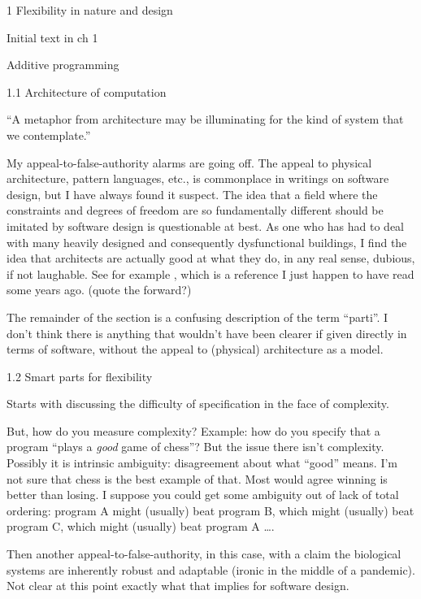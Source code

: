 \documentclass[11pt]{PalisadesLakesBook}
\begin{document}
\begin{plSection}{}
\begin{plSection}{1 Flexibility in nature and design}
\begin{plSection}{Initial text in ch 1}
\begin{plSection}{Additive programming}
\end{plSection}%
\end{plSection}%
\begin{plSection}{1.1 Architecture of computation}

``A metaphor from architecture may be illuminating for the kind
of system that we contemplate.''

My appeal-to-false-authority alarms are going off.
The appeal to physical architecture, pattern languages, etc.,
is commonplace in writings on software design,
but I have always found it suspect.
The idea that a field 
where the constraints and degrees of freedom
are so fundamentally different should be imitated 
by software design is questionable at best.
As one who has had to deal with many heavily designed
and consequently dysfunctional buildings,
I find the idea that architects are actually good at what they do,
in any real sense, dubious, if not laughable.
See for example ,
which is a reference I just happen to have read some years ago.
(\TODO quote the forward?)

The remainder of the section is a confusing description 
of the term ``parti''.
I don't think there is anything that wouldn't have been 
clearer if given directly in terms of software,
without the appeal to (physical) architecture as a model. 

\end{plSection}%
\begin{plSection}{1.2 Smart parts for flexibility}

Starts with discussing the difficulty of specification
in the face of complexity. 

But, how do you measure complexity?
Example: how do you specify that a program
``plays a \emph{good} game of chess''?
But the issue there isn't complexity.
Possibly it is intrinsic ambiguity: disagreement about what
``good'' means.
I'm not sure that chess is the best example of that.
Most would agree winning is better than losing.
I suppose you could get some ambiguity out of lack of
total ordering: 
program A might (usually) beat program B,
which might (usually) beat program C, 
which might (usually) beat program A {\ldots}.

Then another appeal-to-false-authority,
in this case, with a claim the biological systems
are inherently robust and adaptable
(ironic in the middle of a pandemic).
Not clear at this point exactly what that implies for software
design.


\end{plSection}
\end{plSection}
\end{plSection}
\end{document}

